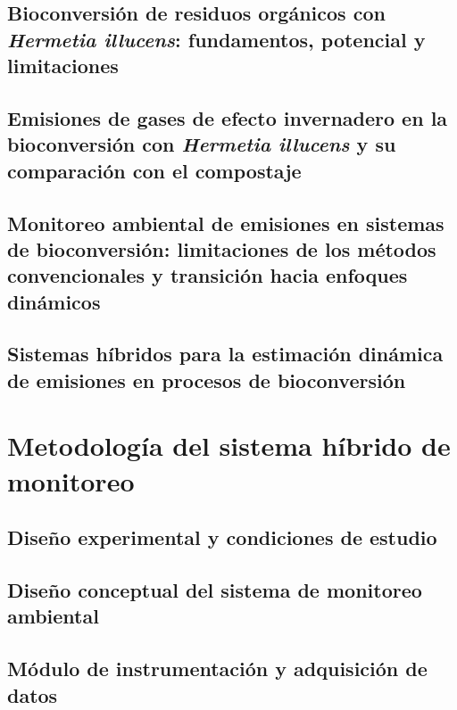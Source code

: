 \documentclass[10pt,spanish,fleqn,openany,twoside,letterpaper]{book}
\begin{document}
\section{Bioconversión de residuos orgánicos con \textit{Hermetia illucens}: fundamentos, potencial y limitaciones}
%

\section[Emisiones GEI]{Emisiones de gases de efecto invernadero en la bioconversión con \textit{Hermetia illucens} y su comparación con el compostaje}
%

\section[Monitoreo ambiental]{Monitoreo ambiental de emisiones en sistemas de bioconversión: limitaciones de los métodos convencionales y transición hacia enfoques dinámicos}
%

\section{Sistemas híbridos para la estimación dinámica de emisiones en procesos de bioconversión}
% 

\chapter{Metodología del sistema híbrido de monitoreo}

\section{Diseño experimental y condiciones de estudio}
% 

\section{Diseño conceptual del sistema de monitoreo ambiental}
% 

\section{Módulo de instrumentación y adquisición de datos}
% 
\end{document}
